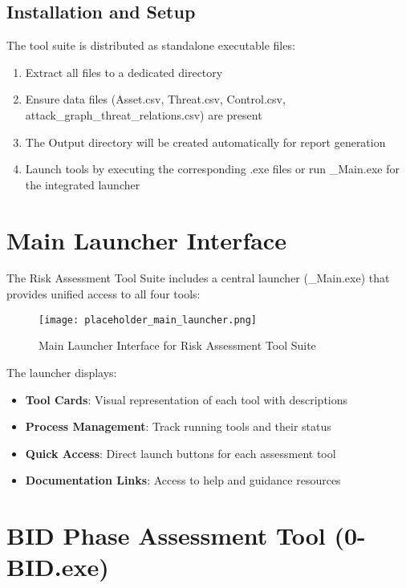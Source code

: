 \documentclass[binding=0.6cm]{sapthesis}
\begin{document}
\subsection{Installation and Setup}

The tool suite is distributed as standalone executable files:

\begin{enumerate}
    \item Extract all files to a dedicated directory
    \item Ensure data files (Asset.csv, Threat.csv, Control.csv, attack\_graph\_threat\_relations.csv) are present
    \item The Output directory will be created automatically for report generation
    \item Launch tools by executing the corresponding .exe files or run \_Main.exe for the integrated launcher
\end{enumerate}

\section{Main Launcher Interface}

The Risk Assessment Tool Suite includes a central launcher (\_Main.exe) that provides unified access to all four tools:

\begin{figure}[H]
    \centering
    \texttt{[image: placeholder\_main\_launcher.png]}
    \caption{Main Launcher Interface for Risk Assessment Tool Suite}
    \label{fig:main_launcher}
\end{figure}

The launcher displays:
\begin{itemize}
    \item \textbf{Tool Cards}: Visual representation of each tool with descriptions
    \item \textbf{Process Management}: Track running tools and their status
    \item \textbf{Quick Access}: Direct launch buttons for each assessment tool
    \item \textbf{Documentation Links}: Access to help and guidance resources
\end{itemize}

\section{BID Phase Assessment Tool (0-BID.exe)}
\end{document}
